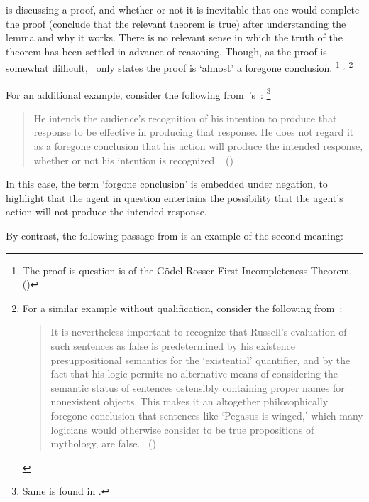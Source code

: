 \begin{note}
  \citeauthor{Machover:1996vu} is discussing a proof, and whether or not it is inevitable that one would complete the proof (conclude that the relevant theorem is true) after understanding the lemma and why it works.
  There is no relevant sense in which the truth of the theorem has been settled in advance of reasoning.
  Though, as the proof is somewhat difficult,~\citeauthor{Machover:1996vu} only states the proof is `almost' a foregone conclusion.%
  \footnote{
    The proof is question is of the G\"{o}del-Rosser First Incompleteness Theorem.
    (\citeyear[Cf.][226]{Machover:1996vu})
  }%
  \(^{,}\)
  \footnote{
    For a similar example without qualification, consider the following from~\textcite{Jacquette:2002up}:
    \begin{quote}
    It is nevertheless important to recognize that Russell’s evaluation of such sentences as false is predetermined by his existence presuppositional semantics for the ‘existential’ quantifier, and by the fact that his logic permits no alternative means of considering the semantic status of sentences ostensibly containing proper names for nonexistent objects.
    This makes it an altogether philosophically foregone conclusion that sentences like ‘Pegasus is winged,’ which many logicians would otherwise consider to be true propositions of mythology, are false.%
    \mbox{ }\hfill\mbox{(\citeyear[6]{Jacquette:2002up})}
  \end{quote}
  }

  For an additional example, consider the following from~\citeauthor{Grice:1957vg}'s~:%
  \footnote{
    Same is found in \textcite[219]{Grice:1989uf}.
  }
  \begin{quote}
    He intends the audience's recognition of his intention to produce that response to be effective in producing that response.
    He does not regard it as a foregone conclusion that his action will produce the intended response, whether or not his intention is recognized.\newline
    \mbox{ }\hfill\mbox{(\citeyear[385]{Grice:1957vg})}
  \end{quote}

  In this case, the term `forgone conclusion' is embedded under negation, to highlight that the agent in question entertains the possibility that the agent's action will not produce the intended response.

  By contrast, the following passage from \textcite{Kadane:1996vu} is an example of the second meaning:


\end{note}

